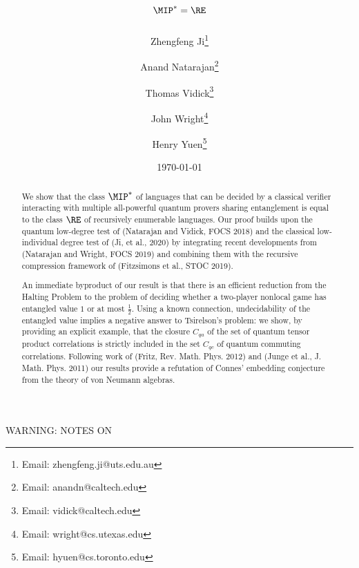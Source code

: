 \documentclass[11pt]{article}
\theoremstyle{definition}
\newcommand{\noteswarning}{{\begin{center} {\Large WARNING: NOTES ON}\endnote{Warning: notes on}\end{center}}}
\newcommand{\noteswarning}{{}}
\begin{document}
\title{$\MIP^* = \RE$}
\author[1]{Zhengfeng Ji\footnote{Email: zhengfeng.ji@uts.edu.au}}
\author[2,3]{Anand Natarajan\footnote{Email: anandn@caltech.edu}}
\author[3]{Thomas Vidick\footnote{Email: vidick@caltech.edu}}
\author[2,3,4]{John Wright\footnote{Email: wright@cs.utexas.edu}}
\author[5]{Henry Yuen\footnote{Email: hyuen@cs.toronto.edu}}

\date{\today}
\maketitle

\noteswarning


\begin{abstract}
We show that the class $\MIP^*$ of languages that can be decided by a
classical verifier interacting with multiple all-powerful
quantum provers sharing entanglement is equal to the class $\RE$ of recursively
enumerable languages. Our proof builds upon the quantum low-degree test of (Natarajan and Vidick, FOCS 2018) and the classical low-individual degree test of (Ji, et al., 2020) by integrating recent developments from (Natarajan and Wright, FOCS 2019) and combining them with the recursive compression framework of (Fitzsimons et al., STOC 2019).

An immediate byproduct of our result is that there is an efficient reduction from the Halting Problem to the problem of deciding whether a two-player nonlocal game has entangled value $1$ or at most $\frac{1}{2}$.
Using a known connection, undecidability of the entangled value implies a negative answer to Tsirelson's problem: we show, by providing an explicit example, that the closure $C_{qa}$ of the set of quantum tensor product correlations is strictly included in the set $C_{qc}$ of quantum commuting correlations. Following work of (Fritz, Rev. Math. Phys. 2012) and (Junge et al., J. Math. Phys. 2011) our results provide a refutation of Connes' embedding conjecture from the theory of von Neumann algebras.

\end{abstract}
\end{document}
